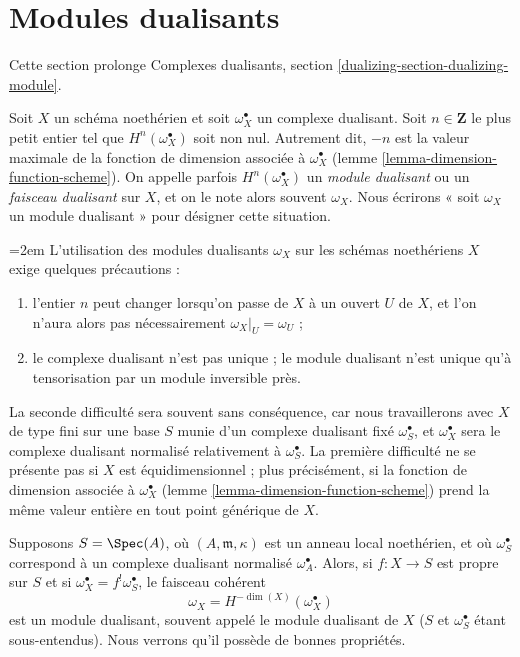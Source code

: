 \section{Modules dualisants}
\label{section-dualizing-module}


\noindent
Cette section prolonge Complexes dualisants, section \ref{dualizing-section-dualizing-module}.

\medskip\noindent
Soit $X$ un schéma noethérien et soit $\omega_X^\bullet$ un complexe dualisant. Soit $n \in \mathbf{Z}$ le plus petit entier tel que $H^n(\omega_X^\bullet)$ soit non nul. Autrement dit, $-n$ est la valeur maximale de la fonction de dimension associée à $\omega_X^\bullet$ (lemme \ref{lemma-dimension-function-scheme}). On appelle parfois $H^n(\omega_X^\bullet)$ un {\it module dualisant} ou un {\it faisceau dualisant} sur $X$, et on le note alors souvent $\omega_X$. Nous écrirons « soit $\omega_X$ un module dualisant » pour désigner cette situation.

\medskip\noindent
\begingroup\emergencystretch=2em
L'utilisation des modules dualisants $\omega_X$ sur les schémas noethériens $X$ exige quelques précautions :\par\endgroup
\begin{enumerate}
\item l'entier $n$ peut changer lorsqu'on passe de $X$ à un ouvert $U$ de $X$, et l'on n'aura alors pas nécessairement $\omega_X|_U = \omega_U$ ;
\item le complexe dualisant n'est pas unique ; le module dualisant n'est unique qu'à tensorisation par un module inversible près.
\end{enumerate}
La seconde difficulté sera souvent sans conséquence, car nous travaillerons avec $X$ de type fini sur une base $S$ munie d'un complexe dualisant fixé $\omega_S^\bullet$, et $\omega_X^\bullet$ sera le complexe dualisant normalisé relativement à $\omega_S^\bullet$. La première difficulté ne se présente pas si $X$ est équidimensionnel ; plus précisément, si la fonction de dimension associée à $\omega_X^\bullet$ (lemme \ref{lemma-dimension-function-scheme}) prend la même valeur entière en tout point générique de $X$.

\begin{example}
\label{example-proper-over-local}
Supposons $S = \Spec(A)$, où $(A, \mathfrak m, \kappa)$ est un anneau local noethérien, et où $\omega_S^\bullet$ correspond à un complexe dualisant normalisé $\omega_A^\bullet$. Alors, si $f : X \to S$ est propre sur $S$ et si $\omega_X^\bullet = f^!\omega_S^\bullet$, le faisceau cohérent
$$
\omega_X = H^{-\dim(X)}(\omega_X^\bullet)
$$
est un module dualisant, souvent appelé le module dualisant de $X$ ($S$ et $\omega_S^\bullet$ étant sous-entendus). Nous verrons qu'il possède de bonnes propriétés.
\end{example}

